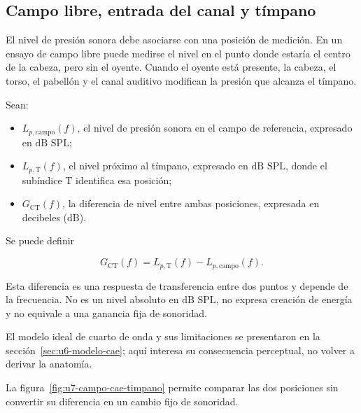 \subsection{Campo libre, entrada del canal y tímpano}
\label{sec:u7-campo-timpano}

El nivel de presión sonora debe asociarse con una posición de medición. En un
ensayo de campo libre puede medirse el nivel en el punto donde estaría el
centro de la cabeza, pero sin el oyente. Cuando el oyente está presente, la
cabeza, el torso, el pabellón y el canal auditivo modifican la presión que
alcanza el tímpano.

Sean:

\begin{itemize}
    \item \(L_{p,\mathrm{campo}}(f)\), el nivel de presión sonora en el campo
    de referencia, expresado en \(\text{dB SPL}\);
    \item \(L_{p,\mathrm{T}}(f)\), el nivel próximo al tímpano,
    expresado en \(\text{dB SPL}\), donde el subíndice \(\mathrm{T}\)
    identifica esa posición;
    \item \(G_{\mathrm{CT}}(f)\), la diferencia de nivel entre ambas
    posiciones, expresada en decibeles (\(\text{dB}\)).
\end{itemize}

Se puede definir

\begin{equation}
    G_{\mathrm{CT}}(f)
      =L_{p,\mathrm{T}}(f)-L_{p,\mathrm{campo}}(f).
    \label{eq:u7-ganancia-campo-timpano}
\end{equation}

Esta diferencia es una respuesta de transferencia entre dos puntos y depende
de la frecuencia. No es un nivel absoluto en \(\text{dB SPL}\), no expresa
creación de energía y no equivale a una ganancia fija de sonoridad.

 El modelo ideal de cuarto
de onda y sus limitaciones se presentaron en la
sección~\ref{sec:u6-modelo-cae}; aquí interesa su consecuencia perceptual, no
volver a derivar la anatomía.

La figura~\ref{fig:u7-campo-cae-timpano} permite comparar las dos posiciones
sin convertir su diferencia en un cambio fijo de sonoridad.

